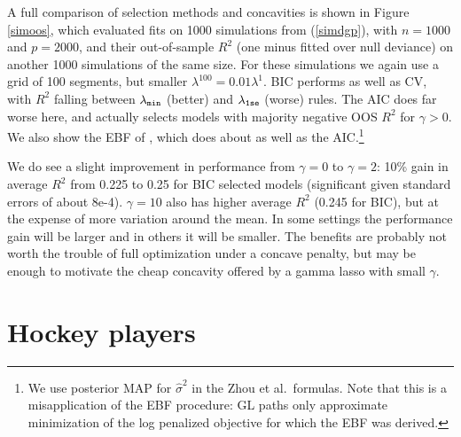 \documentclass[12pt]{article}
\begin{document}
A full comparison of selection methods and concavities is shown in Figure
\ref{simoos}, which evaluated fits on 1000 simulations from (\ref{simdgp}),
with $n=1000$ and $p=2000$, and their out-of-sample $R^2$ (one minus fitted
over null deviance) on another 1000 simulations of the same size.  For these
simulations we again use a grid of 100 segments, but smaller $\lambda^{100} =
0.01\lambda^1$.  BIC performs as well as CV, with $R^2$ falling between
$\lambda_{\tt min}$ (better) and $\lambda_{\tt 1se}$ (worse) rules.  The AIC
does far worse here, and actually selects models with majority negative OOS
$R^2$ for $\gamma >0$. We also show the EBF of \cite{zhou_path_2012}, which
does about as well as the AIC.\footnote{We use posterior MAP for
$\hat\sigma^2$ in the Zhou et al.~formulas.  Note that this is a
misapplication of the EBF procedure:  GL paths only approximate
minimization of the log penalized objective for which the EBF was derived.}

We do see a slight improvement in performance from $\gamma=0$ to $\gamma=2$:
10\% gain in average $R^2$ from 0.225 to 0.25 for BIC selected models
(significant given standard errors of about 8e-4). $\gamma=10$ also has higher
average $R^2$ (0.245 for BIC), but at the expense of more variation around the
mean. In some settings the performance gain will be larger and in others it
will be smaller. The benefits are probably not worth the trouble of full
optimization under a concave penalty, but may be enough to motivate the cheap
concavity offered by a gamma lasso with small $\gamma$.



\section{Hockey players}
\label{nhl}
\end{document}
